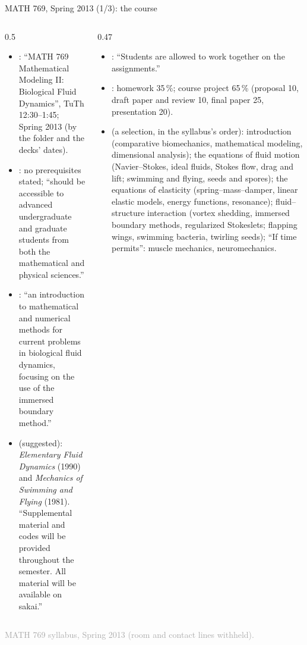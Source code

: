 \documentclass[aspectratio=169,11pt]{beamer}
\newcommand{\sourcecredit}[1]{\vfill\begin{flushright}\tiny\textcolor{DarkGray}{#1}\end{flushright}}
\begin{document}
\begin{frame}{MATH 769, Spring 2013 (1/3): the course}
\label{fr:m769a}
\begin{columns}[T,onlytextwidth]
\begin{column}{0.5\textwidth}
\footnotesize
\begin{itemize}\setlength{\itemsep}{3pt}
  \item {}: ``MATH 769 Mathematical Modeling II: Biological Fluid Dynamics'', TuTh 12:30--1:45; Spring 2013 (by the folder and the decks' dates).
  \item {}: no prerequisites stated; ``should be accessible to advanced undergraduate and graduate students from both the mathematical and physical sciences.''
  \item {}: ``an introduction to mathematical and numerical methods for current problems in biological fluid dynamics, focusing on the use of the immersed boundary method.''
  \item {} (suggested): \emph{Elementary Fluid Dynamics} (1990) and \emph{Mechanics of Swimming and Flying} (1981). ``Supplemental material and codes will be provided throughout the semester. All material will be available on sakai.''
\end{itemize}
\end{column}
\begin{column}{0.47\textwidth}
\footnotesize
\begin{itemize}\setlength{\itemsep}{3pt}
  \item {}: ``Students are allowed to work together on the assignments.''
  \item {}: homework 35\,\%; course project 65\,\% (proposal 10, draft paper and review 10, final paper 25, presentation 20).
  \item \scriptsize{} (a selection, in the syllabus's order): introduction (comparative biomechanics, mathematical modeling, dimensional analysis); the equations of fluid motion (Navier--Stokes, ideal fluids, Stokes flow, drag and lift; swimming and flying, seeds and spores); the equations of elasticity (spring--mass--damper, linear elastic models, energy functions, resonance); fluid--structure interaction (vortex shedding, immersed boundary methods, regularized Stokeslets; flapping wings, swimming bacteria, twirling seeds); ``If time permits'': muscle mechanics, neuromechanics.
\end{itemize}
\end{column}
\end{columns}
\sourcecredit{MATH 769 syllabus, Spring 2013 (room and contact lines withheld).}
\end{frame}
\end{document}

